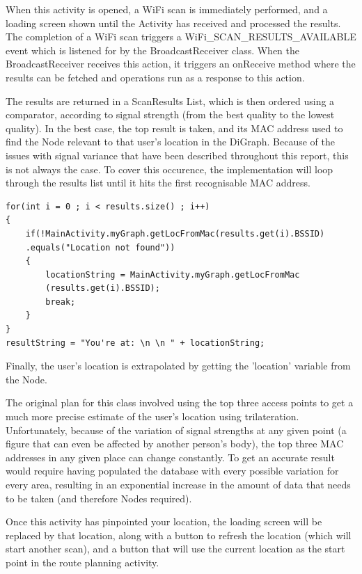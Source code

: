\documentclass[11pt]{informatics-report}
\begin{document}
When this activity is opened, a WiFi scan is immediately performed, and a loading screen shown until the Activity has received and processed the results. The completion of a WiFi scan triggers a WiFi\_SCAN\_RESULTS\_AVAILABLE event which is listened for by the BroadcastReceiver class. When the BroadcastReceiver receives this action, it triggers an onReceive method where the results can be fetched and operations run as a response to this action.

The results are returned in a ScanResults List, which is then ordered using a comparator, according to signal strength (from the best quality to the lowest quality). In the best case, the top result is taken, and its MAC address used to find the Node relevant to that user's location in the DiGraph. Because of the issues with signal variance that have been described throughout this report, this is not always the case. To cover this occurence, the implementation will loop through the results list until it hits the first recognisable MAC address.

\begin{verbatim}
for(int i = 0 ; i < results.size() ; i++)
{
    if(!MainActivity.myGraph.getLocFromMac(results.get(i).BSSID)
    .equals("Location not found"))
    {
        locationString = MainActivity.myGraph.getLocFromMac
        (results.get(i).BSSID);
        break;
    }
}
resultString = "You're at: \n \n " + locationString;
\end{verbatim}

Finally, the user's location is extrapolated by getting the 'location' variable from the Node.

The original plan for this class involved using the top three access points to get a much more precise estimate of the user's location using trilateration. Unfortunately, because of the variation of signal strengths at any given point (a figure that can even be affected by another person's body), the top three MAC addresses in any given place can change constantly. To get an accurate result would require having populated the database with every possible variation for every area, resulting in an exponential increase in the amount of data that needs to be taken (and therefore Nodes required). 

Once this activity has pinpointed your location, the loading screen will be replaced by that location, along with a button to refresh the location (which will start another scan), and a button that will use the current location as the start point in the route planning activity.
\end{document}
